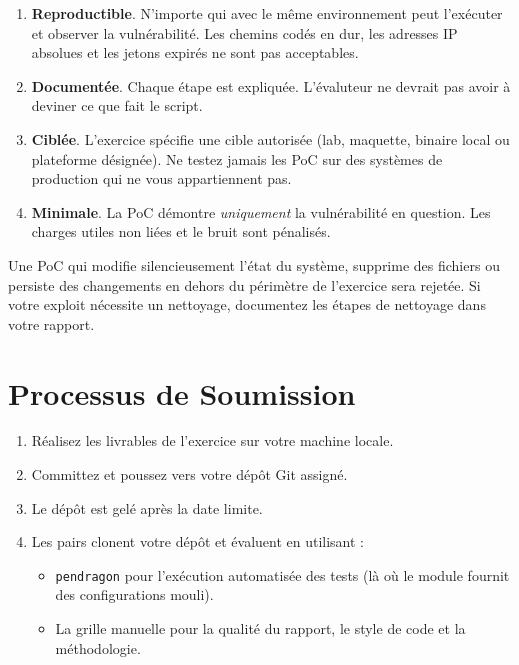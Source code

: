 \begin{enumerate}
  \item \textbf{Reproductible}. N'importe qui avec le m\^eme environnement peut
        l'ex\'ecuter et observer la vuln\'erabilit\'e. Les chemins cod\'es en dur,
        les adresses IP absolues et les jetons expir\'es ne sont pas acceptables.
  \item \textbf{Document\'ee}. Chaque \'etape est expliqu\'ee. L'\'evaluteur ne
        devrait pas avoir \`a deviner ce que fait le script.
  \item \textbf{Cibl\'ee}. L'exercice sp\'ecifie une cible autoris\'ee
        (lab, maquette, binaire local ou plateforme d\'esign\'ee). Ne testez
        jamais les PoC sur des syst\`emes de production qui ne vous appartiennent pas.
  \item \textbf{Minimale}. La PoC d\'emontre \emph{uniquement} la vuln\'erabilit\'e
        en question. Les charges utiles non li\'ees et le bruit sont p\'enalis\'es.
\end{enumerate}

\begin{warning}
  Une PoC qui modifie silencieusement l'\'etat du syst\`eme, supprime des
  fichiers ou persiste des changements en dehors du p\'erim\`etre de l'exercice
  sera rejet\'ee. Si votre exploit n\'ecessite un nettoyage, documentez les
  \'etapes de nettoyage dans votre rapport.
\end{warning}

\section{Processus de Soumission}

\begin{enumerate}
  \item R\'ealisez les livrables de l'exercice sur votre machine locale.
  \item Committez et poussez vers votre d\'ep\^ot Git assign\'e.
  \item Le d\'ep\^ot est gel\'e apr\`es la date limite.
  \item Les pairs clonent votre d\'ep\^ot et \'evaluent en utilisant :
        \begin{itemize}
          \item \texttt{pendragon} pour l'ex\'ecution automatis\'ee des tests
                (l\`a o\`u le module fournit des configurations mouli).
          \item La grille manuelle pour la qualit\'e du rapport, le style de
                code et la m\'ethodologie.
        \end{itemize}
\end{enumerate}

